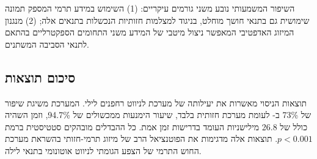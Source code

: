 השיפור המשמעותי נובע משני גורמים עיקריים: (1) השימוש במידע תרמי המספק תמונה שימושית גם בתנאי חושך מוחלט, בניגוד למצלמות חזותיות הנכשלות בתנאים אלה; (2) מנגנון המיזוג האדפטיבי המאפשר ניצול מיטבי של המידע משני התחומים הספקטרליים בהתאם לתנאי הסביבה המשתנים.

\subsection{סיכום תוצאות}
\label{sec:ch08_summary}

תוצאות הניסוי מאשרות את יעילותה של מערכת  לניווט רחפנים לילי. המערכת משיגת שיפור של 73\% ב- לעומת מערכת חזותית בלבד, שיעור הימנעות ממכשולים של 94.7\%, וזמן השהיה כולל של 26.8 מילישניות העומד בדרישות זמן אמת. כל ההבדלים מובהקים סטטיסטית ברמת $p < 0.001$. תוצאות אלה מדגימות את הפוטנציאל הרב של מיזוג תרמי-חזותי בהשראת מערכת החוש התרמי של הצפע הגומתי לניווט אוטונומי בתנאי לילה.
